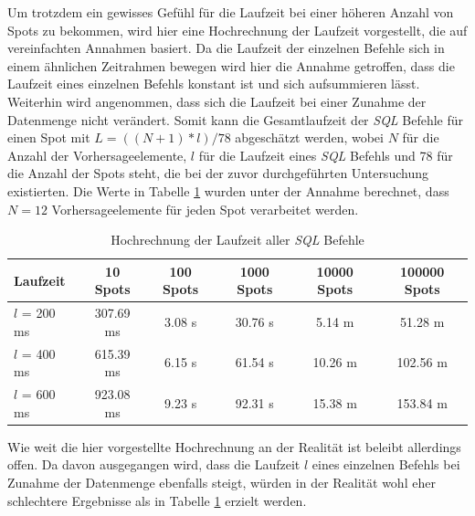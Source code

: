 Um trotzdem ein gewisses Gefühl für die Laufzeit bei einer höheren
Anzahl von Spots zu bekommen, wird hier eine Hochrechnung der Laufzeit
vorgestellt, die auf vereinfachten Annahmen basiert. Da die Laufzeit
der einzelnen Befehle sich in einem ähnlichen Zeitrahmen bewegen wird
hier die Annahme getroffen, dass die Laufzeit eines einzelnen Befehls
konstant ist und sich aufsummieren lässt. Weiterhin wird angenommen,
dass sich die Laufzeit bei einer Zunahme der Datenmenge nicht
verändert. Somit kann die Gesamtlaufzeit der \textit{SQL} Befehle für
einen Spot mit $L = ((N+1) * l) / 78$ abgeschätzt werden, wobei $N$
für die Anzahl der Vorhersageelemente, $l$ für die Laufzeit eines
\textit{SQL} Befehls und 78 für die Anzahl der Spots steht, die bei
der zuvor durchgeführten Untersuchung existierten. Die Werte in
Tabelle \ref{tab:sql_laufzeit} wurden unter der Annahme berechnet,
dass $N=12$ Vorhersageelemente für jeden Spot verarbeitet werden.

\begin{table}[h]
  \centering
  {\sf
    \footnotesize
    \begin{longtable}{l|c|c|c|c|c}

      \toprule
      \textbf{Laufzeit} & \textbf{10 Spots} & \textbf{100 Spots} & \textbf{1000 Spots} & \textbf{10000 Spots} & \textbf{100000 Spots} \\
      \midrule
      $l$ = 200 ms & 307.69 ms & 3.08 s & 30.76 s &  5.14 m &  51.28 m \\
      $l$ = 400 ms & 615.39 ms & 6.15 s & 61.54 s & 10.26 m & 102.56 m \\
      $l$ = 600 ms & 923.08 ms & 9.23 s & 92.31 s & 15.38 m & 153.84 m \\
      \bottomrule

    \end{longtable}
  }

  \caption{Hochrechnung der Laufzeit aller \textit{SQL} Befehle}
  \label{tab:sql_laufzeit}

\end{table}

Wie weit die hier vorgestellte Hochrechnung an der Realität ist
beleibt allerdings offen. Da davon ausgegangen wird, dass die Laufzeit
$l$ eines einzelnen Befehls bei Zunahme der Datenmenge ebenfalls
steigt, würden in der Realität wohl eher schlechtere Ergebnisse
als in Tabelle \ref{tab:sql_laufzeit} erzielt werden.

